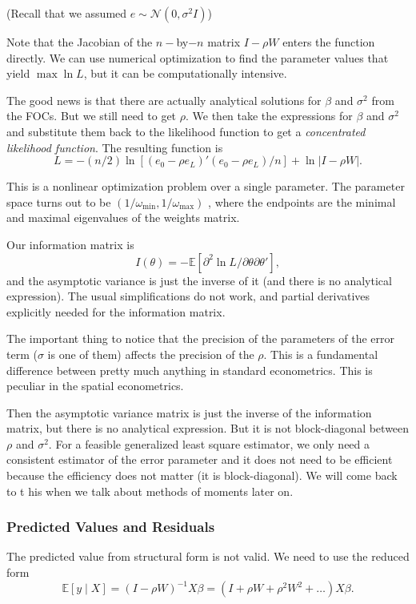 \documentclass[11pt,a4paper]{amsart}
\theoremstyle{plain}
\theoremstyle{definition}
\begin{document}
(Recall that we assumed $e \sim \mathscr{N}(0, \sigma^{2}I)$) 

Note that the Jacobian of the $n-$by$-n$ matrix $I-\rho W$ enters the function directly. We can use numerical optimization to find the parameter values that yield $\max \ln L$, but it can be computationally intensive.

The good news is that there are actually analytical solutions for $\beta$ and $\sigma^{2}$ from the FOCs. But we still need to get $\rho$. We then take the expressions for  $\beta$ and $\sigma^{2}$ and substitute them back to the likelihood function to get a \textit{concentrated likelihood function}. The resulting function is 
\[	L = -(n/2) \ln [(e_{0}-\rho e_{L})'(e_{0}-\rho e_{L})/n] + \ln |I-\rho W|.	\]

This is a nonlinear optimization problem over a single parameter. The parameter space turns out to be $(1/\omega_{\min}, 1/\omega_{\max})$ , where the endpoints are the minimal and maximal eigenvalues of the weights matrix. 

Our information matrix is 
\[	I(\theta) = - \mathbb{E}[\partial^{2} \ln  L/\partial \theta \partial \theta'],	\]
and the asymptotic variance is just the inverse of it (and there is no analytical expression). The usual simplifications do not work, and partial derivatives explicitly needed for the information matrix. 

The important thing to notice that the precision of the parameters of the error term ($\sigma$ is one of them) affects the precision of the $\rho$. This is a fundamental difference between pretty much anything in standard econometrics. This is peculiar in the spatial econometrics. 

Then the asymptotic variance matrix is just the inverse of the information matrix, but there is no analytical expression. But it is not block-diagonal between $\rho$ and $\sigma^{2}$. For a feasible generalized least square estimator, we only need a consistent estimator of the error parameter and it does not need to be efficient because the efficiency does not matter (it is block-diagonal). We will come back to t his when we talk about methods of moments later on. 

\subsubsection{Predicted Values and Residuals}\hfill\par 
The predicted value from structural form is not valid. We need to use the reduced form 
\[	\mathbb{E}[y \mid X] = (I - \rho W)^{-1}X \beta = (I + \rho W + \rho^{2}W^{2} + \dots) X \beta.	\]
\end{document}
